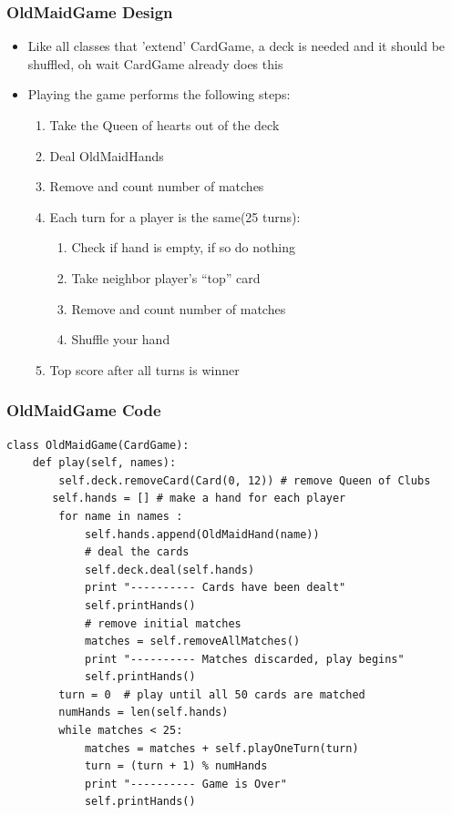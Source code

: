 \documentclass{beamer}
\newcommand\Fontix{\fontsize{9}{8.3}\selectfont}
\begin{document}
\begin{frame}[fragile]
\frametitle{OldMaidGame Design}
\begin{itemize}
\item Like all classes that 'extend' CardGame, a deck is needed and it should be shuffled, oh wait CardGame already does this
\item Playing the game performs the following steps:
\begin{enumerate}
\item Take the Queen of hearts out of the deck
\item Deal OldMaidHands
\item Remove and count number of matches
\item Each turn for a player is the same(25 turns):
\begin{enumerate}
\item Check if hand is empty, if so do nothing
\item Take neighbor player’s “top” card
\item Remove and count number of matches
\item Shuffle your hand
\end{enumerate}
\item Top score after all turns is winner
\end{enumerate}
\end{itemize} 
\end{frame}

\begin{frame}[fragile]
\frametitle{OldMaidGame Code}
\Fontix
\begin{lstlisting}
class OldMaidGame(CardGame):
    def play(self, names):
        self.deck.removeCard(Card(0, 12)) # remove Queen of Clubs 
       self.hands = [] # make a hand for each player 
        for name in names :
            self.hands.append(OldMaidHand(name))
            # deal the cards 
            self.deck.deal(self.hands)
            print "---------- Cards have been dealt"
            self.printHands()
            # remove initial matches 
            matches = self.removeAllMatches()
            print "---------- Matches discarded, play begins"
            self.printHands()
	    turn = 0  # play until all 50 cards are matched 
        numHands = len(self.hands)
        while matches < 25:
            matches = matches + self.playOneTurn(turn)
            turn = (turn + 1) % numHands
            print "---------- Game is Over"
            self.printHands()
\end{lstlisting}
\end{frame}
\end{document}
